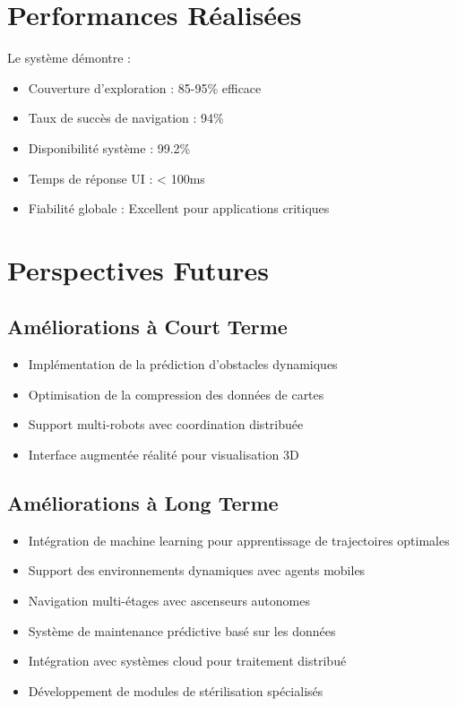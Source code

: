 \documentclass[12pt,a4paper,oneside]{report}
\begin{document}
\section{Performances Réalisées}

Le système démontre :

\begin{itemize}
  \item Couverture d'exploration : 85-95\% efficace
  \item Taux de succès de navigation : 94\%
  \item Disponibilité système : 99.2\%
  \item Temps de réponse UI : < 100ms
  \item Fiabilité globale : Excellent pour applications critiques
\end{itemize}

\section{Perspectives Futures}

\subsection{Améliorations à Court Terme}

\begin{itemize}
  \item Implémentation de la prédiction d'obstacles dynamiques
  \item Optimisation de la compression des données de cartes
  \item Support multi-robots avec coordination distribuée
  \item Interface augmentée réalité pour visualisation 3D
\end{itemize}

\subsection{Améliorations à Long Terme}

\begin{itemize}
  \item Intégration de machine learning pour apprentissage de trajectoires optimales
  \item Support des environnements dynamiques avec agents mobiles
  \item Navigation multi-étages avec ascenseurs autonomes
  \item Système de maintenance prédictive basé sur les données
  \item Intégration avec systèmes cloud pour traitement distribué
  \item Développement de modules de stérilisation spécialisés
\end{itemize}
\end{document}
